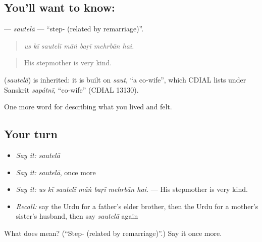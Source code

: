 \subsection*{You'll want to know: }
\textbf{} — \emph{sautelā} — \textquotedblleft{}step- (related by remarriage)\textquotedblright{}.

\begin{quote}
      
\end{quote}

\begin{quote}
\emph{us kī sautelī māṅ baṛī mehrbān hai.}
\end{quote}

\begin{quote}
His stepmother is very kind.
\end{quote}

\begin{cousinweb}
\textbf{} (\emph{sautelā}) is inherited: it is built on \emph{saut}, \textquotedblleft{}a co-wife\textquotedblright{}, which CDIAL lists under Sanskrit \emph{sapátnī}, \textquotedblleft{}co-wife\textquotedblright{} (CDIAL 13130).
\end{cousinweb}

\begin{grammarlens}[title={What you've built}]
One more word for describing what you lived and felt.
\end{grammarlens}

\subsection*{Your turn}
\begin{itemize}
\raggedright
  \item \emph{Say it:} \emph{sautelā}
  \item \emph{Say it:} \emph{sautelā}, once more
  \item \emph{Say it:} \emph{us kī sautelī māṅ baṛī mehrbān hai.} — His stepmother is very kind.
  \item \emph{Recall:} say the Urdu for a father's elder brother, then the Urdu for a mother's sister's husband, then say \emph{sautelā} again
\end{itemize}

\begin{tcolorbox}[breakable,colback=teal!4,colframe=teal!35!black,title={Before you move on}]
What does  mean? (\textquotedblleft{}Step- (related by remarriage)\textquotedblright{}.) Say it once more.
\end{tcolorbox}
